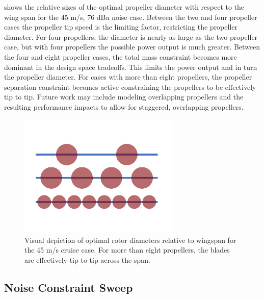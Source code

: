 \documentclass[conf]{new-aiaa}
\begin{document}
 shows the relative sizes of the optimal propeller diameter with respect to the wing span for the 45 m/s, 76 dBa noise case. Between the two and four propeller cases the propeller tip speed is the limiting factor, restricting the propeller diameter. For four propellers, the diameter is nearly as large as the two propeller case, but with four propellers the possible power output is much greater. Between the four and eight propeller cases, the total mass constraint becomes more dominant in the design space tradeoffs. This limits the power output and in turn the propeller diameter. For cases with more than eight propellers, the propeller separation constraint becomes active constraining the propellers to be effectively tip to tip. Future work may include modeling overlapping propellers and the resulting performance impacts to allow for staggered, overlapping propellers.

\begin{figure}[H]
    \centering
    \includegraphics[trim={2.0cm 3.5cm 2.0cm 4.5cm},clip,angle = 0,width=3.0in]{propsize}
    \caption{Visual depiction of optimal rotor diameters relative to wingspan for the 45 m/s cruise case. For more than eight propellers, the blades are effectively tip-to-tip across the span.}
    \label{f:propsize}
\end{figure}


\subsection{Noise Constraint Sweep}

\label{sec:noise}
\end{document}
